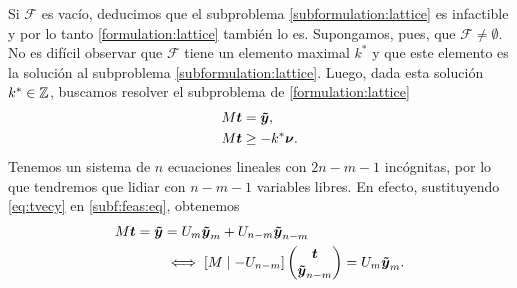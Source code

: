 
Si $\mathcal{F}$ es vacío, deducimos que el subproblema \eqref{subformulation:lattice} es infactible
y por lo tanto \eqref{formulation:lattice} también lo es. Supongamos, pues, que $\mathcal{F} \neq
\emptyset$. No es difícil observar que $\mathcal{F}$ tiene un elemento maximal $k^*$ y que este
elemento es la solución al subproblema \eqref{subformulation:lattice}. Luego, dada esta solución
$k^* \in \mathbb{Z}$, buscamos resolver el subproblema de \eqref{formulation:lattice}
\begin{subequations}
	\label{subformulation:feasibility}
	\begin{align}
		M\boldsymbol{t} &= \boldsymbol{\tilde{y}}, \label{subf:feas:eq} \\
		M\boldsymbol{t} &\geq -k^*\boldsymbol{\nu}. \label{subf:feas:ineq}
	\end{align}
\end{subequations}
Tenemos un sistema de $n$ ecuaciones lineales con $2n - m - 1$ incógnitas, por lo que tendremos que
lidiar con $n - m - 1$ variables libres. En efecto, sustituyendo \eqref{eq:tvecy} en
\eqref{subf:feas:eq}, obtenemos
\begin{align}
	\label{eq:feasibility-eqs}
	M\boldsymbol{t} = \boldsymbol{\tilde{y}} &= U_m\boldsymbol{\tilde{y}}_m + U_{n-m}\boldsymbol{\tilde{y}}_{n-m} \nonumber \\
   &\iff [M \mid -U_{n-m}] \begin{pmatrix} \boldsymbol{t} \\ \boldsymbol{\tilde{y}}_{n-m} \end{pmatrix} = U_m\boldsymbol{\tilde{y}}_m.
\end{align}

